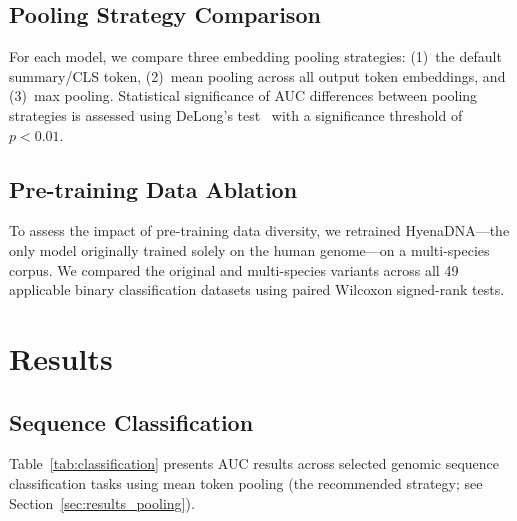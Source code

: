 \documentclass{article}
\begin{document}
\subsection{Pooling Strategy Comparison}

For each model, we compare three embedding pooling strategies: (1)~the default
summary/CLS token, (2)~mean pooling across all output token embeddings, and
(3)~max pooling. Statistical significance of AUC differences between pooling
strategies is assessed using DeLong's test~\citep{delong_1988_comparing} with a
significance threshold of $p < 0.01$.

\subsection{Pre-training Data Ablation}

To assess the impact of pre-training data diversity, we retrained HyenaDNA---the
only model originally trained solely on the human genome---on a multi-species
corpus. We compared the original and multi-species variants across all 49
applicable binary classification datasets using paired Wilcoxon signed-rank
tests.

\section{Results}
\label{sec:results}

\subsection{Sequence Classification}
\label{sec:results_classification}

Table~\ref{tab:classification} presents AUC results across selected genomic
sequence classification tasks using mean token pooling (the recommended strategy;
see Section~\ref{sec:results_pooling}).
\end{document}
